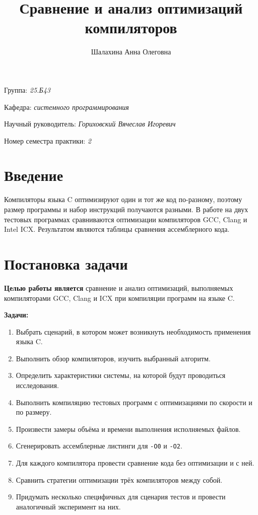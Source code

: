 \documentclass[a4paper]{article}
\title{Сравнение и анализ оптимизаций компиляторов}
\author{Шалахина Анна Олеговна}
\date{}
\begin{document}
\maketitle

\begin{flushright}
    Группа: \emph{25.Б43}

    Кафедра: \emph{системного программирования}

    Научный руководитель: \emph{Гориховский Вячеслав Игоревич}
    
    Номер семестра практики: \emph{2}
\end{flushright} 

\section{Введение}

Компиляторы языка C оптимизируют один и тот же код по-разному, поэтому размер программы и набор инструкций получаются разными. В работе на двух тестовых программах сравниваются оптимизации компиляторов GCC, Clang и Intel ICX. Результатом являются таблицы сравнения ассемблерного кода.

\section{Постановка задачи}

\textbf{Целью работы является} сравнение и анализ оптимизаций, выполняемых компиляторами GCC, Clang и ICX при компиляции программ на языке C.

\textbf{Задачи:}
\begin{enumerate}
    \item Выбрать сценарий, в котором может возникнуть необходимость применения языка C.
    \item Выполнить обзор компиляторов, изучить выбранный алгоритм.
    \item Определить характеристики системы, на которой будут проводиться исследования.
    \item Выполнить компиляцию тестовых программ с оптимизациями по скорости и по размеру.
    \item Произвести замеры объёма и времени выполнения исполняемых файлов.
    \item Сгенерировать ассемблерные листинги для \texttt{-O0} и \texttt{-O2}.
    \item Для каждого компилятора провести сравнение кода без оптимизации и с ней.
    \item Сравнить стратегии оптимизации трёх компиляторов между собой.
    \item Придумать несколько специфичных для сценария тестов и провести аналогичный эксперимент на них.
\end{enumerate}
\end{document}
